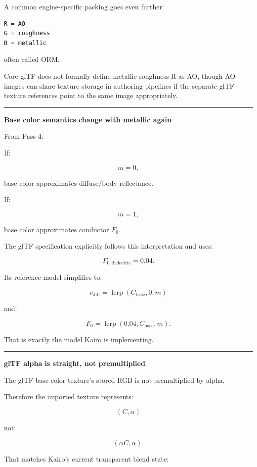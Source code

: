 A common engine-specific packing goes even further:

\begin{verbatim}
R = AO
G = roughness
B = metallic
\end{verbatim}

often called ORM.

Core glTF does not formally define metallic-roughness R as AO, though AO images can share texture storage in authoring pipelines if the separate glTF texture references point to the same image appropriately.

\begin{center}\rule{0.5\linewidth}{0.5pt}\end{center}

\textbf{Base color semantics change with metallic again}

From Pass 4:

If:

\[
m=0,
\]

base color approximates diffuse/body reflectance.

If:

\[
m=1,
\]

base color approximates conductor \(F_0\).

The glTF specification explicitly follows this interpretation and uses:

\[
F_{0,\text{dielectric}}=0.04.
\]

Its reference model simplifies to:

\[
c_{\text{diff}}
=
\operatorname{lerp}(C_{\text{base}},0,m)
\]

and:

\[
F_0=
\operatorname{lerp}(0.04,C_{\text{base}},m).
\]

That is exactly the model Kairo is implementing.

\begin{center}\rule{0.5\linewidth}{0.5pt}\end{center}

\textbf{glTF alpha is straight, not premultiplied}

The glTF base-color texture's stored RGB is not premultiplied by alpha.

Therefore the imported texture represents:

\[
(C,\alpha)
\]

not:

\[
(\alpha C,\alpha).
\]

That matches Kairo's current transparent blend state:

